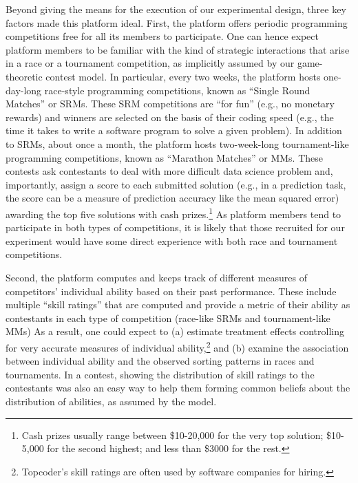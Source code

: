 \documentclass[11pt, titlepage]{article}
\begin{document}
Beyond giving the means for the execution of our experimental design,
three key factors made this platform ideal. First, the platform offers
periodic programming competitions free for all its members to
participate. One can hence expect platform members to be familiar with
the kind of strategic interactions that arise in a race or a tournament
competition, as implicitly assumed by our game-theoretic contest model.
In particular, every two weeks, the platform hosts one-day-long
race-style programming competitions, known as ``Single Round Matches''
or SRMs. These SRM competitions are ``for fun'' (e.g., no monetary
rewards) and winners are selected on the basis of their coding speed
(e.g., the time it takes to write a software program to solve a given
problem). In addition to SRMs, about once a month, the platform hosts
two-week-long tournament-like programming competitions, known as
``Marathon Matches'' or MMs. These contests ask contestants to deal with
more difficult data science problem and, importantly, assign a score to
each submitted solution (e.g., in a prediction task, the score can be a
measure of prediction accuracy like the mean squared error) awarding the
top five solutions with cash prizes.\footnote{Cash prizes usually range
  between \$10-20,000 for the very top solution; \$10-5,000 for the
  second highest; and less than \$3000 for the rest.} As platform
members tend to participate in both types of competitions, it is likely
that those recruited for our experiment would have some direct
experience with both race and tournament competitions.

Second, the platform computes and keeps track of different measures of
competitors' individual ability based on their past performance. These
include multiple ``skill ratings'' that are computed and provide a
metric of their ability as contestants in each type of competition
(race-like SRMs and tournament-like MMs) As a result, one could expect
to (a) estimate treatment effects controlling for very accurate measures
of individual ability,\footnote{Topcoder's skill ratings are often used
  by software companies for hiring.} and (b) examine the association
between individual ability and the observed sorting patterns in races
and tournaments. In a contest, showing the distribution of skill ratings
to the contestants was also an easy way to help them forming common
beliefs about the distribution of abilities, as assumed by the model.
\end{document}

